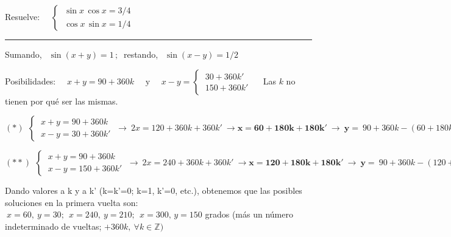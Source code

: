 \begin{miejercicio}

Resuelve: $\quad \begin{cases} \ \sin x \, \cos x= 3/4 \\ \ \cos x \, \sin x = 1/4 \end{cases}$

\rule{250pt}{0.1pt}

\vspace{4mm} Sumando, $\ \ \sin(x+y)=1\, ; \ $ restando, $\ \ \sin(x-y)=1/2$

\vspace{2mm} Posibilidades: $\quad x+y= 90 +360k \quad \text{ y } \quad x-y=\begin{cases} \ 30+360k' \\ \ 150+360 k' \end{cases}\quad $	Las $k$ no tienen por qué ser las mismas.

\vspace{2mm} $(*)\ \ \begin{cases} \ x+y=90+360k \\ \ x-y=30+360k' \end{cases} \ \to \ 2x=120+360k+360k' \ \to \boldsymbol{x=60+180k+180k'} \ \to \ \boldsymbol{y=} \ 90+360k-(60+180k+180k')\ \boldsymbol{=30+180k-180k'}$

\vspace{2mm} $(**)\ \ \begin{cases} \ x+y=90+360k \\ \ x-y=150+360k' \end{cases} \ \to \ 2x=240+360k+360k' \ \to \boldsymbol{x=120+180k+180k'} \ \to \ \boldsymbol{y=} \ 90+360k-(120+180k+180k')\ \boldsymbol{=-30+180k-180k'}$

\vspace{2mm} Dando valores a k y a k' (k=k'=0; k=1, k'=0,  etc.), obtenemos que las posibles soluciones en la primera vuelta son: $\ x=60,\ y=30;\ \ x=240,\ y=210;\ \ x=300,\, y=150$ grados (más un número indeterminado de vueltas; $+360 k,\ \forall k \in \mathbb Z)\ $

\end{miejercicio}


